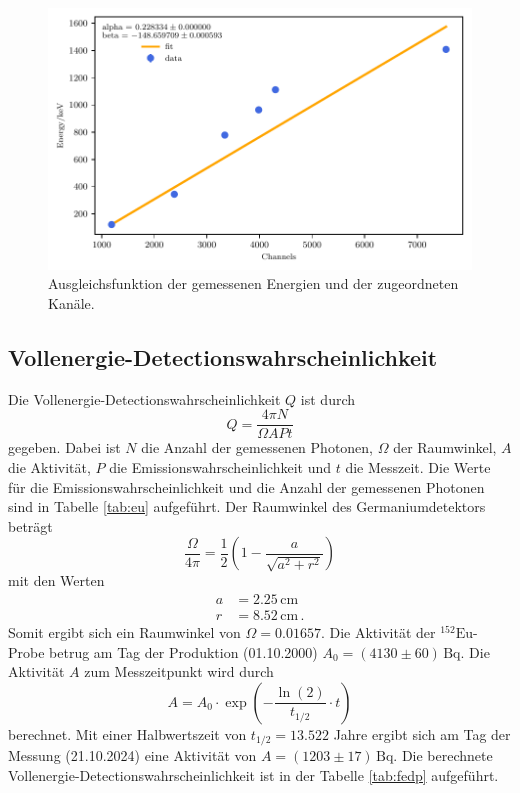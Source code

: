 \begin{figure}[H]
  \centering
  \includegraphics[width=\textwidth]{../plots/Europium-Fit.pdf}
  \caption{Ausgleichsfunktion der gemessenen Energien und der zugeordneten Kanäle.}
  \label{fig:kalibrierung}
\end{figure}

\subsection{Vollenergie-Detectionswahrscheinlichkeit}
Die Vollenergie-Detectionswahrscheinlichkeit $Q$ ist durch 
\begin{equation}
  Q = \frac{4 \pi N}{\Omega A P t}
\end{equation}
gegeben.
Dabei ist $N$ die Anzahl der gemessenen Photonen, $\Omega$ der Raumwinkel, $A$ die Aktivität, $P$ die Emissionswahrscheinlichkeit und $t$ die Messzeit.
Die Werte für die Emissionswahrscheinlichkeit und die Anzahl der gemessenen Photonen sind in Tabelle \ref{tab:eu} aufgeführt.
Der Raumwinkel des Germaniumdetektors beträgt
\begin{equation}
  \frac{\Omega}{4\pi} =\frac{1}{2}\left(1-\frac{a}{\sqrt{a^2+r^2}}\right) 
\end{equation}
mit den Werten 
\begin{align*}
  a &= 2.25 \, \si{\centi\meter} \\
  r &= 8.52 \, \si{\centi\meter} \, .
\end{align*}
Somit ergibt sich ein Raumwinkel von $\Omega = 0.01657$.
Die Aktivität der $^{152}\text{Eu}$-Probe betrug am Tag der Produktion (01.10.2000) $A_0 = (4130 \pm 60) \, \si{\becquerel}$.
Die Aktivität $A$ zum Messzeitpunkt wird durch
\begin{equation}
  A = A_0 \cdot \exp\left(-\frac{\ln(2)}{t_{1/2}} \cdot t\right)
\end{equation}
berechnet.
Mit einer Halbwertszeit von $t_{1/2} = 13.522$ Jahre ergibt sich am Tag der Messung (21.10.2024) 
eine Aktivität von $A = ( 1203 \pm 17 ) \, \si{\becquerel}$.
Die berechnete Vollenergie-Detectionswahrscheinlichkeit ist in der Tabelle \ref{tab:fedp} aufgeführt.


